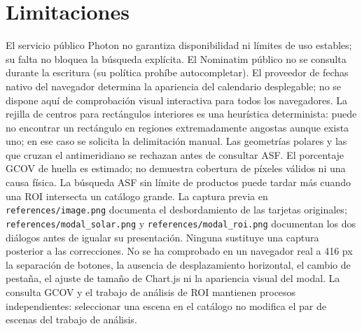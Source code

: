 \documentclass[11pt]{article}
\begin{document}
\section{Limitaciones}
El servicio público Photon no garantiza disponibilidad ni límites de uso estables; su falta no bloquea la búsqueda explícita. El Nominatim público no se consulta durante la escritura (su política prohíbe autocompletar). El proveedor de fechas nativo del navegador determina la apariencia del calendario desplegable; no se dispone aquí de comprobación visual interactiva para todos los navegadores. La rejilla de centros para rectángulos interiores es una heurística determinista: puede no encontrar un rectángulo en regiones extremadamente angostas aunque exista uno; en ese caso se solicita la delimitación manual. Las geometrías polares y las que cruzan el antimeridiano se rechazan antes de consultar ASF. El porcentaje GCOV de huella es estimado; no demuestra cobertura de píxeles válidos ni una causa física. La búsqueda ASF sin límite de productos puede tardar más cuando una ROI intersecta un catálogo grande. La captura previa en \texttt{references/image.png} documenta el desbordamiento de las tarjetas originales; \texttt{references/modal\_solar.png} y \texttt{references/modal\_roi.png} documentan los dos diálogos antes de igualar su presentación. Ninguna sustituye una captura posterior a las correcciones. No se ha comprobado en un navegador real a 416 px la separación de botones, la ausencia de desplazamiento horizontal, el cambio de pestaña, el ajuste de tamaño de Chart.js ni la apariencia visual del modal. La consulta GCOV y el trabajo de análisis de ROI mantienen procesos independientes: seleccionar una escena en el catálogo no modifica el par de escenas del trabajo de análisis.
\end{document}
